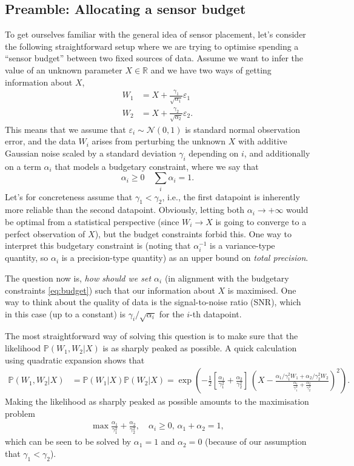 \documentclass[10pt]{article}
\numberwithin{equation}{section}
\numberwithin{figure}{section}
\theoremstyle{remark}
\newcommand{\cN}{\mathcal N}
\newcommand{\R}{\mathbb R}
\renewcommand{\P}{\mathbb P}
\newcommand{\eps}{\varepsilon}
\begin{document}
\subsection{Preamble: Allocating a sensor budget}
To get ourselves familiar with the general idea of sensor placement, let's consider the following straightforward setup where we are trying to optimise spending a ``sensor budget'' between two fixed sources of data. Assume we want to infer the value of an unknown parameter $X\in \R$ and we have two ways of getting information about $X$,
\begin{align*}
    W_1 &= X + \frac{\gamma_1}{\sqrt{\alpha_1}}\eps_1\\
    W_2 &= X + \frac{\gamma_2}{\sqrt{\alpha_2}}\eps_2.
\end{align*}
This means that we assume that $\eps_i\sim\cN(0,1)$ is standard normal observation error, and the data $W_i$ arises from perturbing the unknown $X$ with additive Gaussian noise scaled by a standard deviation $\gamma_i$ depending on $i$, and additionally on a term $ \alpha_i$ that models a budgetary constraint, where we say that 
\begin{equation}\alpha_i\geq 0\quad \sum_i \alpha_i = 1. \label{eq:budget}    
\end{equation}
Let's for concreteness assume that $\gamma_1 < \gamma_2$, i.e., the first datapoint is inherently more reliable than the second datapoint.
Obviously, letting both $\alpha_i\to+\infty$ would be optimal from a statistical perspective (since $W_i\to X$ is going to converge to a perfect observation of $X$), but the budget constraints forbid this.  One way to interpret this budgetary constraint is (noting that $\alpha_i^{-1}$ is a variance-type quantity, so $\alpha_i$ is a precision-type quantity) as an upper bound on \textit{total precision}.

The question now is, \textit{how should we set $\alpha_i$} (in alignment with the budgetary constraints \eqref{eq:budget}) such that our information about $X$ is maximised. One way to think about the quality of data is the signal-to-noise ratio (SNR), which in this case (up to a constant) is $\gamma_i/\sqrt{\alpha_i}$ for the $i$-th datapoint.

The most straightforward way of solving this question is to make sure that the likelihood $\P(W_1,W_2|X)$ is as sharply peaked as possible. A quick calculation using quadratic expansion shows that
\begin{align*}
    \P(W_1,W_2|X) &= \P(W_1|X)\P(W_2|X) = \exp\left(-\frac{1}{2}\left[\frac{\alpha_1}{\gamma_1^2} + \frac{\alpha_2}{\gamma_2^2}\right]\,\left(X - \frac{\alpha_1/\gamma_1^2 W_1 + \alpha_2/\gamma_2^2W_2}{\frac{\alpha_1}{\gamma_1^2} + \frac{\alpha_2}{\gamma_2^2}}\right)^2  \right).
\end{align*}
Making the likelihood as sharply peaked as possible amounts to the maximisation problem
\begin{align*}
    \max \frac{\alpha_1}{\gamma_1^2} + \frac{\alpha_2}{\gamma_2^2},\quad \alpha_i\geq 0,\, \alpha_1+\alpha_2 = 1,
\end{align*}
which can be seen to be solved by $\alpha_1 = 1$ and $\alpha_2 = 0$ (because of our assumption that $\gamma_1 < \gamma_2$).
\end{document}
